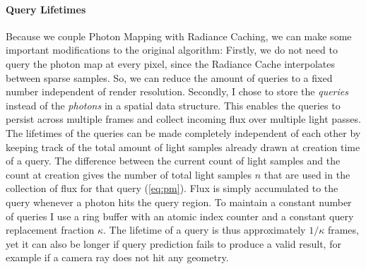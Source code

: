 \paragraph{Query Lifetimes}
Because we couple Photon Mapping with Radiance Caching, we can make some important modifications to the original algorithm:
Firstly, we do not need to query the photon map at every pixel, since the Radiance Cache interpolates between sparse samples.
So, we can reduce the amount of queries to a fixed number independent of render resolution.
Secondly, I chose to store the \emph{queries} instead of the \emph{photons} in a spatial data structure.
This enables the queries to persist across multiple frames and collect incoming flux over multiple light passes.
The lifetimes of the queries can be made completely independent of each other by keeping track of the total amount of light samples already drawn at creation time of a query.
The difference between the current count of light samples and the count at creation gives the number of total light samples $n$ that are used in the collection of flux for that query (\cref{eq:pm}).
Flux is simply accumulated to the query whenever a photon hits the query region.
To maintain a constant number of queries I use a ring buffer with an atomic index counter and a constant query replacement fraction $\kappa$.
The lifetime of a query is thus approximately $1/\kappa$ frames, yet it can also be longer if query prediction fails to produce a valid result, for example if a camera ray does not hit any geometry.

